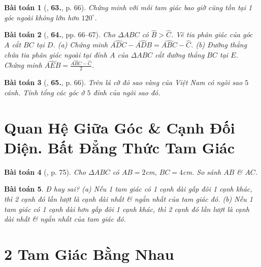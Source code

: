 \documentclass{article}
\numberwithin{equation}{section}
\newtheorem{baitoan}{Bài toán}
\begin{document}
\begin{baitoan}[\cite{Tuyen_Toan_7}, \textbf{63.}, p. 66]
	Chứng minh với mỗi tam giác bao giờ cũng tồn tại 1 góc ngoài không lớn hơn $120^\circ$.
\end{baitoan}

\begin{baitoan}[\cite{Tuyen_Toan_7}, \textbf{64.}, pp. 66--67]
	Cho $\Delta ABC$ có $\widehat{B} > \widehat{C}$. Vẽ tia phân giác của góc $A$ cắt $BC$ tại $D$. (a) Chứng minh $\widehat{ADC} - \widehat{ADB} = \widehat{ABC} - \widehat{C}$. (b) Đường thẳng chứa tia phân giác ngoài tại đỉnh $A$ của $\Delta ABC$ cắt đường thẳng $BC$ tại $E$. Chứng minh $\widehat{AEB} = \frac{\widehat{ABC} - \widehat{C}}{2}$.
\end{baitoan}

\begin{baitoan}[\cite{Tuyen_Toan_7}, \textbf{65.}, p. 66]
	Trên lá cờ đỏ sao vàng của Việt Nam có ngôi sao $5$ cánh. Tính tổng các góc ở $5$ đỉnh của ngôi sao đó.
\end{baitoan}


\section{Quan Hệ Giữa Góc \& Cạnh Đối Diện. Bất Đẳng Thức Tam Giác}

\begin{baitoan}[\cite{SGK_Toan_7_Canh_Dieu_tap_2}, p. 75]
	Cho $\Delta ABC$ có $AB = 2$\emph{cm}, $BC = 4$\emph{cm}. So sánh $AB$ \& $AC$.
\end{baitoan}

\begin{baitoan}
	Đ hay sai? (a) Nếu 1 tam giác có 1 cạnh dài gấp đôi 1 cạnh khác, thì 2 cạnh đó lần lượt là cạnh dài nhất \& ngắn nhất của tam giác đó. (b) Nếu 1 tam giác có 1 cạnh dài hơn gấp đôi 1 cạnh khác, thì 2 cạnh đó lần lượt là cạnh dài nhất \& ngắn nhất của tam giác đó.
\end{baitoan}


\section{2 Tam Giác Bằng Nhau}

\end{document}
